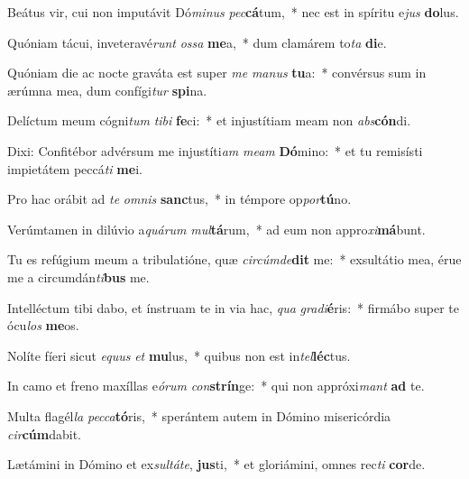 \item Beátus vir, cui non imputávit Dó\textit{mi}\textit{nus} \textit{pec}\textbf{cá}tum,~* nec est in spíritu e\textit{jus} \textbf{do}lus.
\item Quóniam tácui, inveteravé\textit{runt} \textit{os}\textit{sa} \textbf{me}a,~* dum clamárem to\textit{ta} \textbf{di}e.
\item Quóniam die ac nocte graváta est super \textit{me} \textit{ma}\textit{nus} \textbf{tu}a:~* convérsus sum in ærúmna mea, dum confígi\textit{tur} \textbf{spi}na.
\item Delíctum meum cógni\textit{tum} \textit{ti}\textit{bi} \textbf{fe}ci:~* et injustítiam meam non \textit{abs}\textbf{cón}di.
\item Dixi: Confitébor advérsum me injustíti\textit{am} \textit{me}\textit{am} \textbf{Dó}mino:~* et tu remisísti impietátem peccá\textit{ti} \textbf{me}i.
\item Pro hac orábit ad \textit{te} \textit{om}\textit{nis} \textbf{sanc}tus,~* in témpore op\textit{por}\textbf{tú}no.
\item Verúmtamen in dilúvio a\textit{quá}\textit{rum} \textit{mul}\textbf{tá}rum,~* ad eum non appro\textit{xi}\textbf{má}bunt.
\item Tu es refúgium meum a tribulatióne, quæ \textit{cir}\textit{cúm}\textit{de}\textbf{dit} me:~* exsultátio mea, érue me a circumdán\textit{ti}\textbf{bus} me.
\item Intelléctum tibi dabo, et ínstruam te in via hac, \textit{qua} \textit{gra}\textit{di}\textbf{é}ris:~* firmábo super te ócu\textit{los} \textbf{me}os.
\item Nolíte fíeri sicut \textit{e}\textit{quus} \textit{et} \textbf{mu}lus,~* quibus non est in\textit{tel}\textbf{léc}tus.
\item In camo et freno maxíllas e\textit{ó}\textit{rum} \textit{con}\textbf{strín}ge:~* qui non appróxi\textit{mant} \textbf{ad} te.
\item Multa flagél\textit{la} \textit{pec}\textit{ca}\textbf{tó}ris,~* sperántem autem in Dómino misericórdia \textit{cir}\textbf{cúm}dabit.
\item Lætámini in Dómino et ex\textit{sul}\textit{tá}\textit{te}, \textbf{jus}ti,~* et gloriámini, omnes rec\textit{ti} \textbf{cor}de.
